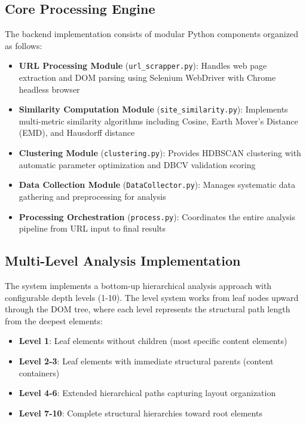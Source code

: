 \subsection{Core Processing Engine}
The backend implementation consists of modular Python components organized as follows:

\begin{itemize}
    \item \textbf{URL Processing Module} (\texttt{url\_scrapper.py}): Handles web page extraction and DOM parsing using Selenium WebDriver with Chrome headless browser
    \item \textbf{Similarity Computation Module} (\texttt{site\_similarity.py}): Implements multi-metric similarity algorithms including Cosine, Earth Mover's Distance (EMD), and Hausdorff distance
    \item \textbf{Clustering Module} (\texttt{clustering.py}): Provides HDBSCAN clustering with automatic parameter optimization and DBCV validation scoring
    \item \textbf{Data Collection Module} (\texttt{DataCollector.py}): Manages systematic data gathering and preprocessing for analysis
    \item \textbf{Processing Orchestration} (\texttt{process.py}): Coordinates the entire analysis pipeline from URL input to final results
\end{itemize}

\subsection{Multi-Level Analysis Implementation}
The system implements a bottom-up hierarchical analysis approach with configurable depth levels (1-10). The level system works from leaf nodes upward through the DOM tree, where each level represents the structural path length from the deepest elements:

\begin{itemize}
    \item \textbf{Level 1}: Leaf elements without children (most specific content elements)
    \item \textbf{Level 2-3}: Leaf elements with immediate structural parents (content containers)
    \item \textbf{Level 4-6}: Extended hierarchical paths capturing layout organization
    \item \textbf{Level 7-10}: Complete structural hierarchies toward root elements
\end{itemize}

